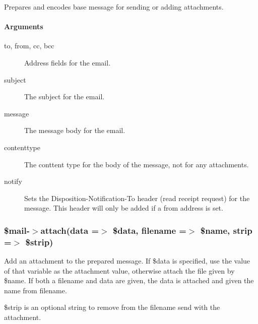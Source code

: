 \begin{description}
\begin{description}
\begin{description}
\begin{description}
\begin{description}
Prepares and encodes base message for sending or adding attachments.

\paragraph*{Arguments\label{LedgerSMB::Mailer_Mail_output_for_LedgerSMB_Arguments}}
\begin{description}

\item[{to, from, cc, bcc}] \mbox{}

Address fields for the email.


\item[{subject}] \mbox{}

The subject for the email.


\item[{message}] \mbox{}

The message body for the email.


\item[{contenttype}] \mbox{}

The conttent type for the body of the message, not for any attachments.


\item[{notify}] \mbox{}

Sets the Disposition-Notification-To header (read receipt request) for the
message.  This header will only be added if a from address is set.

\end{description}
\subsubsection*{\$mail-$>$attach(data =$>$ \$data, filename =$>$ \$name, strip =$>$ \$strip)\label{LedgerSMB::Mailer_Mail_output_for_LedgerSMB__mail-_attach_data_data_filename_name_strip_strip_}}


Add an attachment to the prepared message.  If \$data is specified, use the
value of that variable as the attachment value, otherwise attach the file
given by \$name.  If both a filename and data are given, the data is attached
and given the name from filename.



\$strip is an optional string to remove from the filename send with the
attachment.


\end{description}
\end{description}
\end{description}
\end{description}
\end{description}
